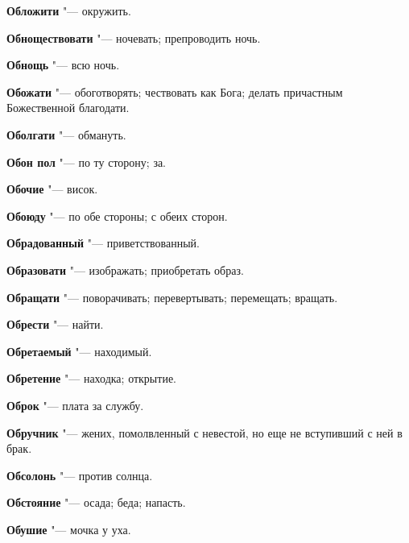 \begin{mymulticols}{2}
\noindent\textbf{Обложити} "--- окружить. 




\noindent\textbf{Обноществовати} "--- ночевать; препроводить ночь. 




\noindent\textbf{Обнощь} "--- всю ночь. 




\noindent\textbf{Обожати} "--- обоготворять; чествовать как Бога; делать причастным Божественной благодати. 




\noindent\textbf{Оболгати} "--- обмануть. 




\noindent\textbf{Обон пол} "--- по ту сторону; за. 




\noindent\textbf{Обочие} "--- висок. 




\noindent\textbf{Обоюду} "--- по обе стороны; с обеих сторон. 




\noindent\textbf{Обрадованный} "--- приветствованный. 




\noindent\textbf{Образовати} "--- изображать; приобретать образ. 




\noindent\textbf{Обращати} "--- поворачивать; перевертывать; перемещать; вращать. 




\noindent\textbf{Обрести} "--- найти. 




\noindent\textbf{Обретаемый} "--- находимый. 




\noindent\textbf{Обретение} "--- находка; открытие. 




\noindent\textbf{Оброк} "--- плата за службу. 




\noindent\textbf{Обручник} "--- жених, помолвленный с невестой, но еще не вступивший с ней в брак. 




\noindent\textbf{Обсолонь} "--- против солнца. 




\noindent\textbf{Обстояние} "--- осада; беда; напасть. 




\noindent\textbf{Обушие} "--- мочка у уха. 





\end{mymulticols}
